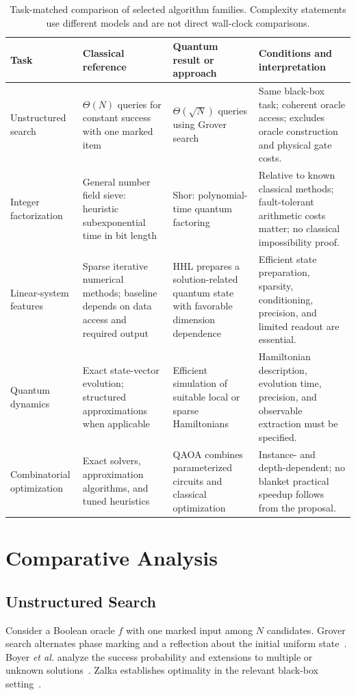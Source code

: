 \documentclass[conference]{IEEEtran}
\begin{document}
\begin{table}[t]
\caption{Task-matched comparison of selected algorithm families. Complexity statements use different models and are not direct wall-clock comparisons.}
\label{tab:comparison}
\centering\footnotesize
\setlength{\tabcolsep}{5pt}
\begin{tabularx}{\textwidth}{p{2.0cm}YYY}
\toprule
Task & Classical reference & Quantum result or approach & Conditions and interpretation\\
\midrule
Unstructured search & $\Theta(N)$ queries for constant success with one marked item & $\Theta(\sqrt N)$ queries using Grover search~\cite{grover,zalka} & Same black-box task; coherent oracle access; excludes oracle construction and physical gate costs.\\
Integer factorization & General number field sieve: heuristic subexponential time in bit length & Shor: polynomial-time quantum factoring~\cite{shor} & Relative to known classical methods; fault-tolerant arithmetic costs matter; no classical impossibility proof.\\
Linear-system features & Sparse iterative numerical methods; baseline depends on data access and required output & HHL prepares a solution-related quantum state with favorable dimension dependence~\cite{hhl} & Efficient state preparation, sparsity, conditioning, precision, and limited readout are essential.\\
Quantum dynamics & Exact state-vector evolution; structured approximations when applicable & Efficient simulation of suitable local or sparse Hamiltonians~\cite{lloyd,berry} & Hamiltonian description, evolution time, precision, and observable extraction must be specified.\\
Combinatorial optimization & Exact solvers, approximation algorithms, and tuned heuristics & QAOA combines parameterized circuits and classical optimization~\cite{farhi} & Instance- and depth-dependent; no blanket practical speedup follows from the proposal.\\
\bottomrule
\end{tabularx}
\end{table}

\section{Comparative Analysis}
\subsection{Unstructured Search}
Consider a Boolean oracle $f$ with one marked input among $N$ candidates. Grover search alternates phase marking and a reflection about the initial uniform state~\cite{grover}. Boyer \emph{et al.} analyze the success probability and extensions to multiple or unknown solutions~\cite{boyer}. Zalka establishes optimality in the relevant black-box setting~\cite{zalka}.
\end{document}
